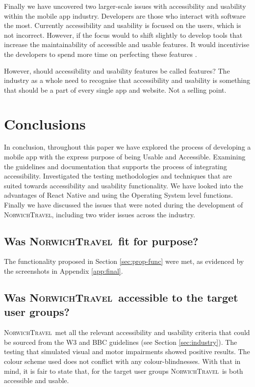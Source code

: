 \documentclass[cmpstyle]{ueacmpstyle}
\newcommand{\nt}{\textsc{NorwichTravel}}
\begin{document}
	Finally we have uncovered two larger-scale issues with accessibility and usability within the mobile app industry. Developers are those who interact with software the most. Currently accessibility and usability is focused on the users, which is not incorrect. However, if the focus would to shift slightly to develop tools that increase the maintainability of accessible and usable features. It would incentivise the developers to spend more time on perfecting these features \citep{developers}.
	
	However, should accessibility and usability features be called features? The industry as a whole need to recognise that accessibility and usability is something that should be a part of every single app and website. Not a selling point.
	\section{Conclusions} \label{sec:conc}
	In conclusion, throughout this paper we have explored the process of developing a mobile app with the express purpose of being Usable and Accessible. Examining the guidelines and documentation that supports the process of integrating accessibility. Investigated the testing methodologies and techniques that are suited towards accessibility and usability functionality. We have looked into the advantages of React Native and using the Operating System level functions. Finally we have discussed the issues that were noted during the development of \nt, including two wider issues across the industry.
	
		\subsection{Was \nt \ fit for purpose?} \label{sec:fit}
		The functionality proposed in Section \ref{sec:prop-func} were met, as evidenced by the screenshots in Appendix \ref{app:final}.
		
		\subsection{Was \nt \ accessible to the target user groups?} \label{sec:accessibletotarget}
		\nt \ met all the relevant accessibility and usability criteria that could be sourced from the W3 and BBC guidelines (see Section \ref{sec:industry}). The testing that simulated visual and motor impairments showed positive results. The colour scheme used does not conflict with any colour-blindnesses. With that in mind, it is fair to state that, for the target user groups \nt \ is both accessible and usable. 
		
\end{document}
